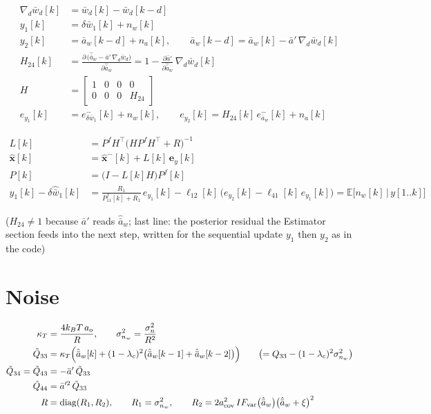 \documentclass[11pt,a4paper,fontset=none]{ctexart}
\newcommand{\ba}{\bar{a}}
\newcommand{\bw}{\bar{w}}
\newcommand{\E}{\mathbb{E}}
\newcommand{\ap}{\ba'}
\newcommand{\dap}{\frac{\partial\ap}{\partial\hat{\ba}_w}}
\begin{document}
\begin{align*}
\nabla_d\bw_d[k] &= \bw_d[k] - \bw_d[k-d] \\
y_1[k] &= \delta\bw_1[k] + n_w[k] \\
y_2[k] &= \ba_w[k-d] + n_a[k], \qquad \ba_w[k-d] = \ba_w[k] - \ap\,\nabla_d\bw_d[k] \\
H_{24}[k] &= \frac{\partial\,\bigl(\hat{\ba}_w - \ap\,\nabla_d\bw_d\bigr)}{\partial\hat{\ba}_w} = 1 - \dap\,\nabla_d\bw_d[k] \\
H &= \begin{bmatrix} 1 & 0 & 0 & 0 \\ 0 & 0 & 0 & H_{24} \end{bmatrix} \\
e_{y_1}[k] &= e^{-}_{\delta\bw_1}[k] + n_w[k], \qquad e_{y_2}[k] = H_{24}[k]\,e^{-}_{\ba_w}[k] + n_a[k]
\end{align*}

\begin{align*}
L[k]         &= P^{f}H^{\top}\bigl(HP^{f}H^{\top} + R\bigr)^{-1} \\
\hat{\mathbf{x}}[k] &= \hat{\mathbf{x}}^{-}[k] + L[k]\,\mathbf{e}_y[k] \\
P[k]         &= \bigl(I - L[k]H\bigr)P^{f}[k] \\
y_1[k] - \delta\hat{\bw}_1[k] &= \frac{R_1}{P^{f}_{11}[k] + R_1}\,e_{y_1}[k] - \ell_{12}[k]\,\bigl(e_{y_2}[k] - \ell_{41}[k]\,e_{y_1}[k]\bigr)
   = \E\bigl[n_w[k]\,\big|\,y[1..k]\bigr]
\end{align*}

($H_{24} \neq 1$ because $\ap$ reads $\hat{\ba}_w$; last line: the posterior residual the Estimator section feeds into the next step,
written for the sequential update $y_1$ then $y_2$ as in the code)

\section{Noise}

\begin{align*}
\kappa_T &= \frac{4k_BT\,a_o}{R}, \qquad \sigma^{2}_{n_w} = \frac{\sigma^{2}_{n}}{R^{2}} \\
\tilde{Q}_{33} &= \kappa_T\Bigl(\hat{\ba}_w[k] + (1-\lambda_c)^{2}\bigl(\hat{\ba}_w[k-1] + \hat{\ba}_w[k-2]\bigr)\Bigr)
   \qquad \bigl(= Q_{33} - (1-\lambda_c)^{2}\sigma^{2}_{n_w}\bigr) \\
\tilde{Q}_{34} = \tilde{Q}_{43} &= -\ap\,\tilde{Q}_{33} \\
\tilde{Q}_{44}   &= \ap^{2}\,\tilde{Q}_{33} \\
R        &= \mathrm{diag}(R_1, R_2), \qquad R_1 = \sigma^{2}_{n_w}, \qquad
R_2 = 2a_{\mathrm{cov}}^{2}\,IF_{\mathrm{var}}\bigl(\hat{\ba}_w\bigr)\bigl(\hat{\ba}_w + \xi\bigr)^{2}
\end{align*}
\end{document}
